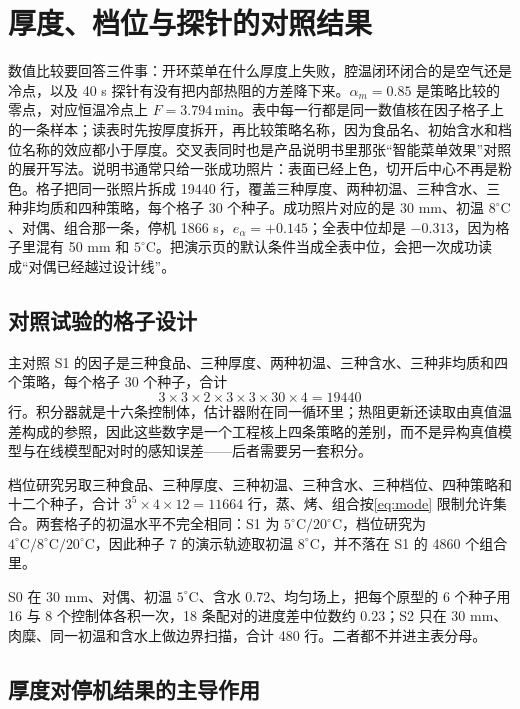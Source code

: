 \chapter{厚度、档位与探针的对照结果}
\label{ch:result}

数值比较要回答三件事：开环菜单在什么厚度上失败，腔温闭环闭合的是空气还是冷点，以及 40 s 探针有没有把内部热阻的方差降下来。\(\alpha_m=0.85\) 是策略比较的零点，对应恒温冷点上 \(F=3.794\,\mathrm{min}\)。表中每一行都是同一数值核在因子格子上的一条样本；读表时先按厚度拆开，再比较策略名称，因为食品名、初始含水和档位名称的效应都小于厚度。交叉表同时也是产品说明书里那张“智能菜单效果”对照的展开写法。说明书通常只给一张成功照片：表面已经上色，切开后中心不再是粉色。格子把同一张照片拆成 19440 行，覆盖三种厚度、两种初温、三种含水、三种非均质和四种策略，每个格子 30 个种子。成功照片对应的是 30 mm、初温 \(8^\circ\mathrm{C}\)、对偶、组合那一条，停机 1866 s，\(e_{\alpha}=+0.145\)；全表中位却是 \(-0.313\)，因为格子里混有 50 mm 和 \(5^\circ\mathrm{C}\)。把演示页的默认条件当成全表中位，会把一次成功读成“对偶已经越过设计线”。

\section{对照试验的格子设计}

主对照 S1 的因子是三种食品、三种厚度、两种初温、三种含水、三种非均质和四个策略，每个格子 30 个种子，合计
\[
3\times 3\times 2\times 3\times 3\times 30\times 4=19440
\]
行。积分器就是十六条控制体，估计器附在同一循环里；热阻更新还读取由真值温差构成的参照，因此这些数字是一个工程核上四条策略的差别，而不是异构真值模型与在线模型配对时的感知误差——后者需要另一套积分。

档位研究另取三种食品、三种厚度、三种初温、三种含水、三种档位、四种策略和十二个种子，合计 \(3^5\times 4\times 12=11664\) 行，蒸、烤、组合按\eqref{eq:mode} 限制允许集合。两套格子的初温水平不完全相同：S1 为 \(5^\circ\mathrm{C}/20^\circ\mathrm{C}\)，档位研究为 \(4^\circ\mathrm{C}/8^\circ\mathrm{C}/20^\circ\mathrm{C}\)，因此种子 7 的演示轨迹取初温 \(8^\circ\mathrm{C}\)，并不落在 S1 的 4860 个组合里。

S0 在 30 mm、对偶、初温 \(5^\circ\mathrm{C}\)、含水 0.72、均匀场上，把每个原型的 6 个种子用 16 与 8 个控制体各积一次，18 条配对的进度差中位数约 \(0.23\)；S2 只在 30 mm、肉糜、同一初温和含水上做边界扫描，合计 480 行。二者都不并进主表分母。

\section{厚度对停机结果的主导作用}

